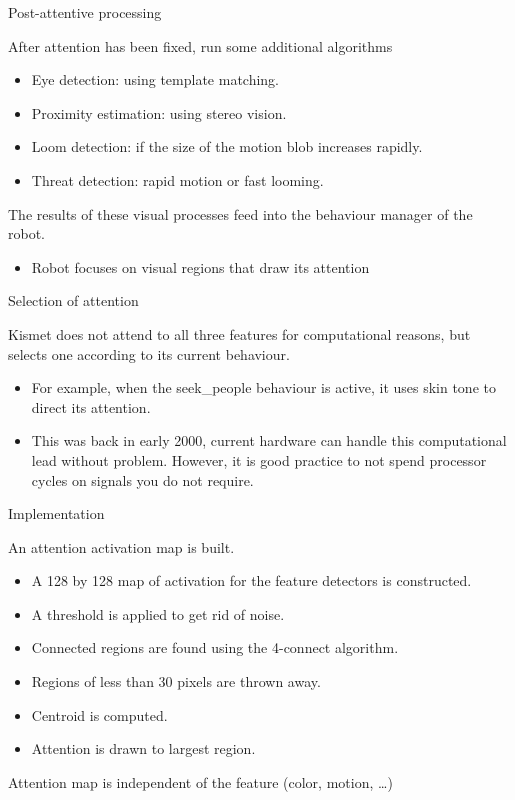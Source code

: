 \documentclass[compress]{beamer}
\providecommand{\tightlist}{%
  \setlength{\itemsep}{0pt}\setlength{\parskip}{0pt}}
\begin{document}
\begin{frame}{Post-attentive processing}

After attention has been fixed, run some additional algorithms

\begin{itemize}
\tightlist
\item
  Eye detection: using template matching.
\item
  Proximity estimation: using stereo vision.
\item
  Loom detection: if the size of the motion blob increases rapidly.
\item
  Threat detection: rapid motion or fast looming.
\end{itemize}

The results of these visual processes feed into the behaviour manager of
the robot.

\begin{itemize}
\tightlist
\item
  Robot focuses on visual regions that draw its attention
\end{itemize}

\end{frame}

\begin{frame}{Selection of attention}

Kismet does not attend to all three features for computational reasons,
but selects one according to its current behaviour.

\begin{itemize}
\tightlist
\item
  For example, when the seek\_people behaviour is active, it uses skin
  tone to direct its attention.
\item
  This was back in early 2000, current hardware can handle this
  computational lead without problem. However, it is good practice to
  not spend processor cycles on signals you do not require.
\end{itemize}

Implementation

An attention activation map is built.

\begin{itemize}
\tightlist
\item
  A 128 by 128 map of activation for the feature detectors is
  constructed.
\item
  A threshold is applied to get rid of noise.
\item
  Connected regions are found using the 4-connect algorithm.
\item
  Regions of less than 30 pixels are thrown away.
\item
  Centroid is computed.
\item
  Attention is drawn to largest region.
\end{itemize}

Attention map is independent of the feature (color, motion, \ldots{})

\end{frame}
\end{document}
